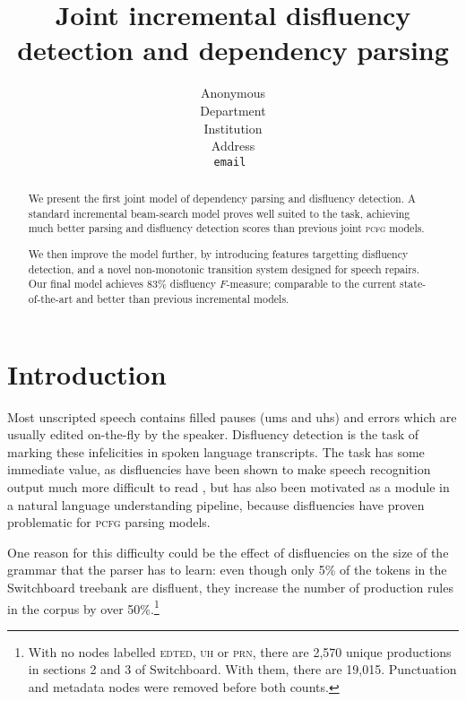 \documentclass[11pt,letterpaper]{article}
\title{Joint incremental disfluency detection and dependency parsing}
\author{
	Anonymous\\
  	Department\\
  	Institution\\
  	Address\\
  {\tt \small email }\\
}
\date{}
\newcommand{\pcfg}{\textsc{pcfg}\xspace}
\begin{document}
\maketitle
\begin{abstract}

    We present the first joint model of dependency parsing and
    disfluency detection. A standard incremental beam-search model
    proves well suited to the task, achieving much better parsing and disfluency
    detection scores than previous joint \pcfg models.

We then improve the model further, by introducing features targetting disfluency
detection, and a novel non-monotonic transition system designed for speech repairs.
Our final model achieves 83\% disfluency $F$-measure; comparable to the current
state-of-the-art and better than previous incremental models.

\end{abstract}

\section{Introduction}

Most unscripted speech contains filled pauses (ums and uhs) and errors which are
usually edited on-the-fly by the speaker. Disfluency detection is the task of
marking these infelicities in spoken language transcripts. The task has some
immediate value, as disfluencies have been shown to make speech recognition output
much more difficult to read \citep{jones:03}, but has also been motivated as
a module in a natural language understanding pipeline, because disfluencies have
proven problematic for \pcfg parsing models.

One reason for this difficulty could be the effect of disfluencies on the size
of the grammar that the parser has to learn: even though only 5\% of the tokens
in the Switchboard treebank \citep{marcus:93} are disfluent, they increase
the number of production rules in the corpus by over 50\%.\footnote{With
no nodes labelled \textsc{edted}, \textsc{uh} or \textsc{prn}, there are
2,570 unique productions in sections 2 and 3 of Switchboard. With them,
there are 19,015. Punctuation and metadata nodes were removed before both counts.}

\end{document}
